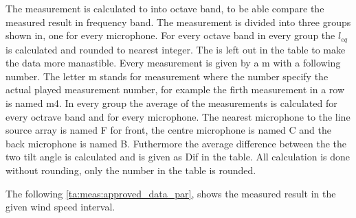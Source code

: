The measurement is calculated to into octave band, to be able compare the measured result in frequency band. The measurement is divided into three groups shown in, one for every microphone. For every octave band in every group the $l_{eq}$ is calculated and rounded to nearest integer. The \db is left out in the table to make the data more manastible. Every measurement is given by a m with a following number. The letter m stands for measurement where the number specify the actual played measurement number, for example the firth measurement in a row is named m4. In every group the average of the measurements is calculated for every octrave band and for every microphone. The nearest microphone to the line source array is named F for front, the centre microphone is named C and the back microphone is named B. Futhermore the average difference between the the two tilt angle is calculated and is given as Dif in the table. All calculation is done without rounding, only the number in the table is rounded.

 The following \autoref{ta:meas:approved_data_par}, shows the measured result in the given wind speed interval.

